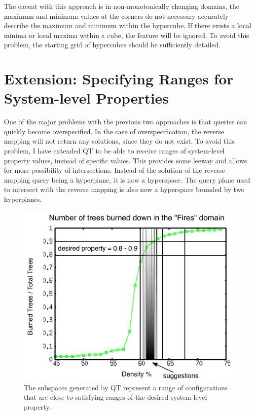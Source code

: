 The caveat with this approach is in non-monotonically changing domains, the maximum and minimum values at the corners do not necessary accurately describe the maximum and minimum within the hypercube.
If there exists a local minima or local maxima within a cube, the feature will be ignored.
To avoid this problem, the starting grid of hypercubes should be sufficiently detailed.

\section{Extension: Specifying Ranges for System-level Properties}
\label{sec:ranges}

One of the major problems with the previous two approaches is that queries can quickly become overspecified.
In the case of overspecification, the reverse mapping will not return any solutions, since they do not exist.
To avoid this problem, I have extended QT to be able to receive ranges of system-level property values, instead of specific values.
This provides some leeway and allows for more possibility of intersections.
Instead of the solution of the reverse-mapping query being a hyperplane, it is now a hyperspace.
The query plane used to intersect with the reverse mapping is also now a hyperspace bounded by two hyperplanes.

\begin{figure}[ht]
\centering
\includegraphics[scale=1]{images/QTfiresranges.pdf}
\caption{The subspaces generated by QT represent a range of configurations that are close to satisfying ranges of the desired system-level property.}
\label{fig:qtfiresranges}
\end{figure}


